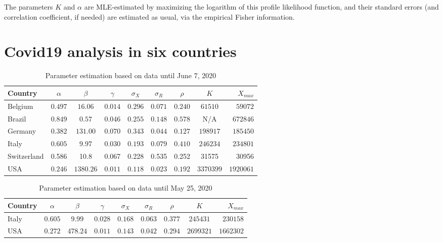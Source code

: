 \documentclass{article}
\begin{document}
\bigskip

The parameters $K$ and $\alpha$ are MLE-estimated by maximizing the logarithm of this profile likelihood function, and their standard errors (and correlation coefficient, if needed) are estimated as usual, via the empirical Fisher information.


\section{Covid19 analysis in six countries} \label{Covid19}

\begin{table}
\begin{center}
\begin{tabular}{l|ccccccc|r}
Country & $\alpha$ & $\beta$ & $\gamma$ & $\sigma_X $ & $ \sigma_R$ & $\rho$ & $K$ & $X_{max}$ \\ \hline
Belgium & $0.497$ & $16.06$ & $0.014$ & $0.296$ & $0.071$ & $0.240$ & $61510$ & $59072$ \\
Brazil  & $0.849$ & $0.57$ & $0.046$ & $0.255$ & $0.148$ & $0.578$ & N/A & $672846$ \\
Germany & $0.382$ & $131.00$ & $0.070$ & $0.343$ & $0.044$ & $0.127$ & $198917$ & $185450$ \\
Italy  & $0.605$ & $9.97$ & $0.030$ & $0.193$ & $0.079$ & $0.410$ & $246234$ & $234801$ \\
Switzerland & 0.586	 &	10.8 & 0.067 & 0.228  & 0.535 & 0.252 & 31575&      30956	    \\
USA    & $0.246$  & $1380.26$ & $0.011$ & $0.118$ & $0.023$ & $0.192$ & $3370399$ & $1920061$ \\ \hline
\end{tabular}
\caption{
Parameter estimation based on data until June 7, 2020
\label{tablejune7}
}
\end{center}
\end{table}

\bigskip

\begin{table}
\begin{center}
\begin{tabular}{l|ccccccc|r}
Country & $\alpha$ & $\beta$ & $\gamma$ & $\sigma_X $ & $ \sigma_R$ & $\rho$ & $K$ & $X_{max}$ \\ \hline
Italy  & $0.605$ & $9.99$ & $0.028$ & $0.168$ & $0.063$ & $0.377$ & $245431$ & $230158$ \\
USA    & $0.272$  & $478.24$ & $0.011$ & $0.143$ & $0.042$ & $0.294$ & $2699321$ & $1662302$\\ \hline
\end{tabular}
\caption{
Parameter estimation based on data until May 25, 2020
\label{tablemay25}
}
\end{center}
\end{table}
\end{document}
